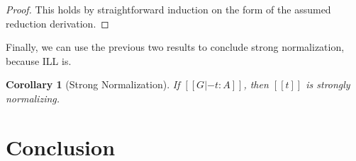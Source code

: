 \documentclass{article}
\newtheorem{corollary}[theorem]{Corollary}
\begin{document}
\begin{proof}
  This holds by straightforward induction on the form of the assumed
  reduction derivation.
\end{proof}
\noindent
Finally, we can use the previous two results to conclude strong
normalization, because ILL is.
\begin{corollary}[Strong Normalization]
  \label{corollary:strong_normalization_lambdaL!}
  If $[[G |- t : A]]$, then $[[t]]$ is strongly normalizing.
\end{corollary}


\section{Conclusion}







\end{document}
